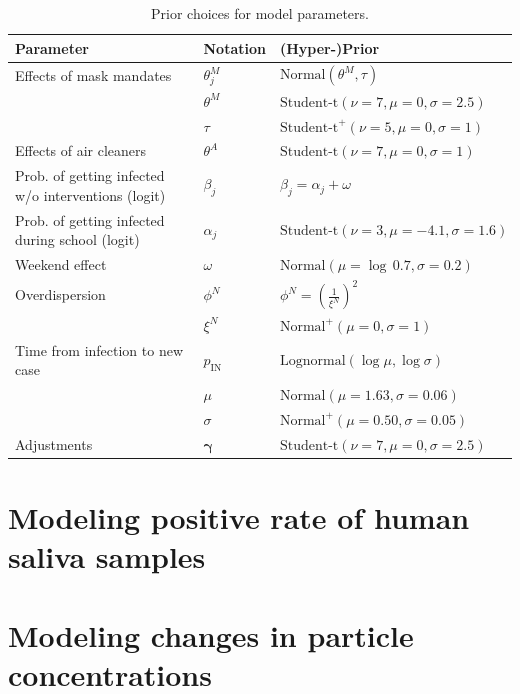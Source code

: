 \documentclass[fleqn,11pt]{wlscirep_supp}
\begin{document}
\begin{table}
\centering
\footnotesize
\begin{tabular}{p{7cm}p{1.5cm}p{6.5cm}}
\toprule
Parameter & Notation & (Hyper-)Prior  \\ 
\midrule
Effects of mask mandates & $\theta_{j}^M$ &  $\textrm{Normal}(\theta^M, \tau)$\\
& $\theta^M$ & $\textrm{Student-t}(\nu = 7, \mu = 0, \sigma = 2.5)$\\
& $\tau$ & $\textrm{Student-t}^{+}(\nu = 5, \mu = 0, \sigma = 1)$ \\
Effects of air cleaners & $\theta^A$ & $\textrm{Student-t}(\nu = 7, \mu = 0, \sigma = 1)$\\
Prob. of getting infected w/o interventions (logit) & $\beta_j$ & $\beta_j = \alpha_j + \omega$ \\
Prob. of getting infected during school (logit) & $\alpha_j$ & $\textrm{Student-t}(\nu = 3, \mu = -4.1, \sigma = 1.6)$ \\
Weekend effect & $\omega$ & $\textrm{Normal}(\mu = \log\,0.7, \sigma = 0.2)$ \\
Overdispersion & $\phi^N$ & $\phi^N = \left(\frac{1}{\xi^N}\right)^2$ \\
 & $\xi^N$ & $\textrm{Normal}^{+}(\mu = 0, \sigma = 1)$ \\
Time from infection to new case & $p_\text{IN}$ & $\textrm{Lognormal}(\log \mu, \log \sigma)$ \\
& $\mu$ & $\textrm{Normal}(\mu = 1.63, \sigma = 0.06)$ \\
& $\sigma$ & $\textrm{Normal}^{\textrm{+}}(\mu = 0.50, \sigma = 0.05)$ \\
Adjustments & $\bm{\gamma}$ & $\textrm{Student-t}(\nu = 7, \mu = 0, \sigma = 2.5)$ \\ 
\bottomrule
\end{tabular}
\caption{Prior choices for model parameters.}
\label{tbl:prior_choices}
\end{table}

\clearpage

\section{Modeling positive rate of human saliva samples}\label{sec:multinomial-model}

\section{Modeling changes in particle concentrations}\label{sec:env-regression-model}
\end{document}
